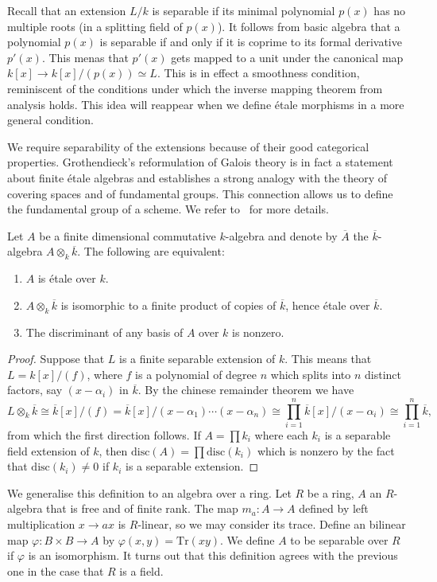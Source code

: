 Recall that an extension $L/k$ is separable if its minimal polynomial $p(x)$ has no multiple roots (in a splitting field of $p(x)$). It follows from basic algebra that a polynomial $p(x)$ is separable if and only if it is coprime to its formal derivative $p'(x)$. This menas that $p'(x)$ gets mapped to a unit under the canonical map $k[x] \to k[x]/(p(x)) \simeq L$. This is in effect a smoothness condition, reminiscent of the conditions under which the inverse mapping theorem from analysis holds. This idea will reappear when we define \'etale morphisms in a more general condition.

We require separability of the extensions because of their good categorical properties. Grothendieck's reformulation of Galois theory is in fact a statement about finite \'etale algebras and establishes a strong analogy with the theory of covering spaces and of fundamental groups. This connection allows us to define the fundamental group of a scheme. We refer to~\cite{Szamuely} for more details.

\begin{theorem}
  Let $A$ be a finite dimensional commutative $k$-algebra and denote by $\overline{A}$ the $\overline{k}$-algebra $A \otimes_k \overline{k}$. The following are equivalent:
  \begin{enumerate}
    \item $A$ is \'etale over $k$.\label{etale}
    \item $A \otimes_k \overline{k}$ is isomorphic to a finite product of copies of $\overline{k}$, hence \'etale over $\overline{k}$.\label{product}
    \item The discriminant of any basis of $A$ over $k$ is nonzero.\label{trace}
  \end{enumerate}
\end{theorem}
\begin{proof}
  Suppose that $L$ is a finite separable extension of $k$. This means that $L = k[x]/(f)$, where $f$ is a polynomial of degree $n$ which splits into $n$ distinct factors, say $(x-\alpha_i)$ in $\overline{k}$. By the chinese remainder theorem we have
  \[L \otimes_k \overline{k} \cong \overline{k}[x]/(f) = \overline{k}[x]/(x-\alpha_1)\cdots(x-\alpha_n) \cong \prod_{i=1}^n \overline{k}[x] / (x-\alpha_i) \cong \prod_{i=1}^n \overline{k},\] from which the first direction follows.
   If $A = \prod k_i$  where each $k_i$ is a separable field extension of $k$, then $\text{disc}(A) = \prod \text{disc}(k_i)$ which is nonzero by the fact that $\text{disc}(k_i) \neq 0$ if $k_i$ is a separable extension.
\end{proof}
We generalise this definition to an algebra over a ring. Let $R$ be a ring, $A$ an $R$-algebra that is free and of finite rank. The map $m_a: A \to A$ defined by left multiplication $x \to ax$ is $R$-linear, so we may consider its trace. Define an bilinear map $\varphi: B \times B \to A$ by $\varphi(x,y) = \text{Tr}(xy)$. We define $A$ to be separable over $R$ if $\varphi$ is an isomorphism. It turns out that this definition agrees with the previous one in the case that $R$ is a field.


